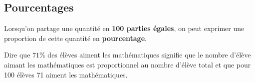 \begin{pageCours}

\section{Pourcentages}

\begin{Def}
Lorsqu'on partage une quantité en \textbf{100 parties égales}, on peut exprimer une proportion de cette quantité en \textbf{pourcentage}.
\end{Def}

\begin{Pp}
Dire que $71\%$ des élèves aiment les mathématiques signifie que le nombre d'élève aimant les mathématiques est proportionnel au nombre d'élève total et que pour 100 élèves 71 aiment les mathématiques.


\end{Pp}
\end{pageCours}
